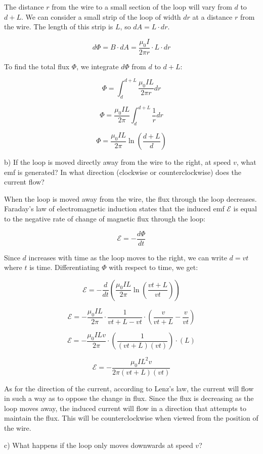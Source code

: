 The distance \( r \) from the wire to a small section of the loop will vary from \( d \) to \( d + L \). We can consider a small strip of the loop of width \( dr \) at a distance \( r \) from the wire. The length of this strip is \( L \), so \( dA = L \cdot dr \).

\[
d\Phi = B \cdot dA = \frac{\mu_0 I}{2 \pi r} \cdot L \cdot dr
\]

To find the total flux \( \Phi \), we integrate \( d\Phi \) from \( d \) to \( d + L \):

\[
\Phi = \int_{d}^{d+L} \frac{\mu_0 I L}{2 \pi r} dr
\]

\[
\Phi = \frac{\mu_0 I L}{2 \pi} \int_{d}^{d+L} \frac{1}{r} dr
\]

\[
\Phi = \frac{\mu_0 I L}{2 \pi} \ln\left(\frac{d+L}{d}\right)
\]

b) If the loop is moved directly away from the wire to the right, at speed \( v \), what emf is generated? In what direction (clockwise or counterclockwise) does the current flow?

When the loop is moved away from the wire, the flux through the loop decreases. Faraday's law of electromagnetic induction states that the induced emf \( \mathcal{E} \) is equal to the negative rate of change of magnetic flux through the loop:

\[
\mathcal{E} = -\frac{d\Phi}{dt}
\]

Since \( d \) increases with time as the loop moves to the right, we can write \( d = vt \) where \( t \) is time. Differentiating \( \Phi \) with respect to time, we get:

\[
\mathcal{E} = -\frac{d}{dt}\left(\frac{\mu_0 I L}{2 \pi} \ln\left(\frac{vt+L}{vt}\right)\right)
\]

\[
\mathcal{E} = -\frac{\mu_0 I L}{2 \pi} \cdot \frac{1}{vt+L - vt} \cdot \left(\frac{v}{vt+L} - \frac{v}{vt}\right)
\]

\[
\mathcal{E} = -\frac{\mu_0 I L v}{2 \pi} \cdot \left(\frac{1}{(vt+L)(vt)}\right) \cdot (L)
\]

\[
\mathcal{E} = -\frac{\mu_0 I L^2 v}{2 \pi (vt+L)(vt)}
\]

As for the direction of the current, according to Lenz's law, the current will flow in such a way as to oppose the change in flux. Since the flux is decreasing as the loop moves away, the induced current will flow in a direction that attempts to maintain the flux. This will be counterclockwise when viewed from the position of the wire.

c) What happens if the loop only moves downwards at speed \( v \)?

